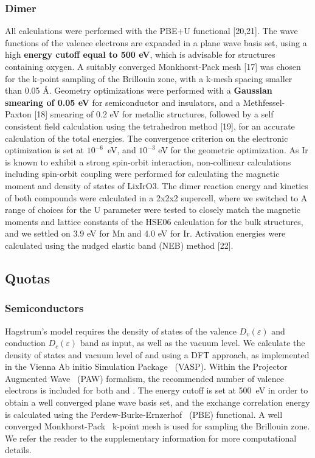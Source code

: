 \begin{refsection}
\subsubsection{Dimer} \label{appendix:sec-dimer} 
All calculations were performed with the PBE+U functional [20,21]. The wave 
functions of the valence electrons are expanded in a plane wave basis set, 
using a high \textbf{energy cutoff equal to 500 eV}, which is advisable for 
structures containing oxygen. A suitably converged Monkhorst-Pack mesh [17] 
was chosen for the k-point sampling of the Brillouin zone, with a k-mesh 
spacing smaller than 0.05 \AA. Geometry optimizations were performed with a 
\textbf{Gaussian smearing of 0.05 eV} for semiconductor and insulators, and a 
Methfessel-Paxton [18] smearing of 0.2 eV for metallic structures, followed by 
a self consistent field calculation using the tetrahedron method [19], for an 
accurate calculation of the total energies. The convergence criterion on the 
electronic optimization is set at $10^{-6}$~eV, and $10^{-3}$ eV for the 
geometric optimization. As Ir is known to exhibit a strong spin-orbit 
interaction, non-collinear calculations including spin-orbit coupling were 
performed for calculating the magnetic moment and density of states of 
LixIrO3. The dimer reaction energy and kinetics of both compounds were 
calculated in a 2x2x2 supercell, where we switched to  A range of choices for 
the U parameter were tested to closely match the magnetic moments and lattice 
constants of the HSE06 calculation for the bulk structures, and we settled on 
3.9 eV for Mn and 4.0 eV for Ir. Activation energies were calculated using the 
nudged elastic band (NEB) method [22].  
 
\subsection{Quotas} \label{appendix:sec-quotas} 
 
\subsubsection{Semiconductors} \label{appendix:sec-semiconductors} 
 
Hagstrum's model requires the density of states of the valence 
$D_v(\varepsilon)$ and conduction $D_c(\varepsilon)$ band as input, as well as 
the vacuum level. We calculate the density of states and vacuum level of 
 and  using a DFT approach, as implemented in the 
Vienna Ab initio Simulation Package~\cite{Kresse1993, Kresse1994, Kresse1996, 
Kresse1996} (VASP). Within the Projector Augmented Wave~\cite{Blochl1994, 
Kresse1999} (PAW) formalism, the recommended number of valence electrons is 
included for both  and . The energy cutoff is set at 
500~\si{\electronvolt} in order to obtain a well converged plane wave basis 
set, and the exchange correlation energy is calculated using the 
Perdew-Burke-Ernzerhof~\cite{Perdew1996} (PBE) functional. A well converged 
Monkhorst-Pack~\cite{Monkhorst1976} k-point mesh is used for sampling the 
Brillouin zone. We refer the reader to the supplementary information for more 
computational details.\\ 
 

\end{refsection}
